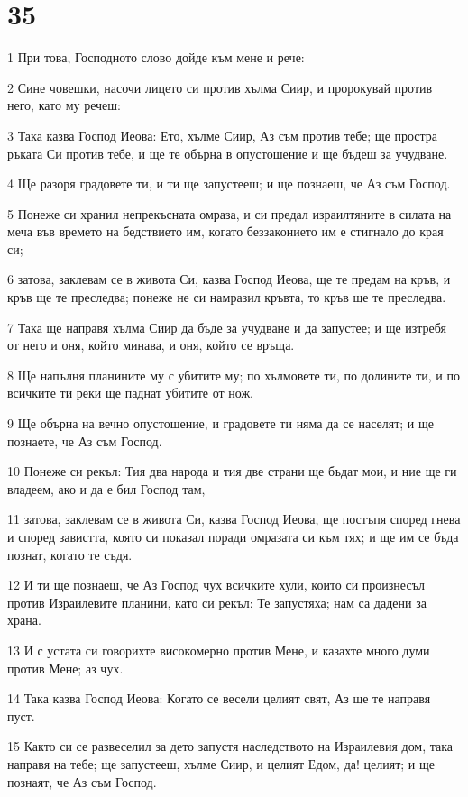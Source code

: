 \chapter{35}

\par 1 При това, Господното слово дойде към мене и рече:
\par 2 Сине човешки, насочи лицето си против хълма Сиир, и пророкувай против него, като му речеш:
\par 3 Така казва Господ Иеова: Ето, хълме Сиир, Аз съм против тебе; ще простра ръката Си против тебе, и ще те обърна в опустошение и ще бъдеш за учудване.
\par 4 Ще разоря градовете ти, и ти ще запустееш; и ще познаеш, че Аз съм Господ.
\par 5 Понеже си хранил непрекъсната омраза, и си предал израилтяните в силата на меча във времето на бедствието им, когато беззаконието им е стигнало до края си;
\par 6 затова, заклевам се в живота Си, казва Господ Иеова, ще те предам на кръв, и кръв ще те преследва; понеже не си намразил кръвта, то кръв ще те преследва.
\par 7 Така ще направя хълма Сиир да бъде за учудване и да запустее; и ще изтребя от него и оня, който минава, и оня, който се връща.
\par 8 Ще напълня планините му с убитите му; по хълмовете ти, по долините ти, и по всичките ти реки ще паднат убитите от нож.
\par 9 Ще обърна на вечно опустошение, и градовете ти няма да се населят; и ще познаете, че Аз съм Господ.
\par 10 Понеже си рекъл: Тия два народа и тия две страни ще бъдат мои, и ние ще ги владеем, ако и да е бил Господ там,
\par 11 затова, заклевам се в живота Си, казва Господ Иеова, ще постъпя според гнева и според завистта, която си показал поради омразата си към тях; и ще им се бъда познат, когато те съдя.
\par 12 И ти ще познаеш, че Аз Господ чух всичките хули, които си произнесъл против Израилевите планини, като си рекъл: Те запустяха; нам са дадени за храна.
\par 13 И с устата си говорихте високомерно против Мене, и казахте много думи против Мене; аз чух.
\par 14 Така казва Господ Иеова: Когато се весели целият свят, Аз ще те направя пуст.
\par 15 Както си се развеселил за дето запустя наследството на Израилевия дом, така направя на тебе; ще запустееш, хълме Сиир, и целият Едом, да! целият; и ще познаят, че Аз съм Господ.

